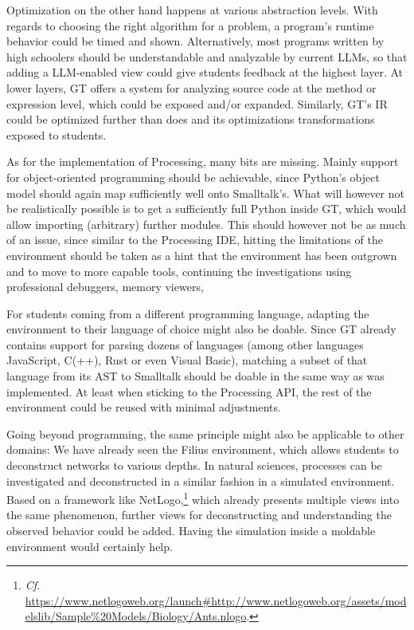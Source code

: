 Optimization on the other hand happens at various abstraction levels. With regards to choosing the right algorithm for a problem, a program's runtime behavior could be timed and shown. Alternatively, most programs written by high schoolers should be understandable and analyzable by current \acp{LLM}, so that adding a \ac{LLM}-enabled view could give students feedback at the highest layer. At lower layers, \ac{GT} offers a  system for analyzing source code at the method or expression level, which could be exposed and/or expanded. Similarly, \ac{GT}'s \ac{IR} could be optimized further than  does and its optimizations transformations exposed to students.

As for the implementation of Processing, many bits are missing. Mainly support for object-oriented programming should be achievable, since Python's object model should again map sufficiently well onto Smalltalk's. What will however not be realistically possible is to get a sufficiently full Python inside \ac{GT}, which would allow importing (arbitrary) further modules. This should however not be as much of an issue, since similar to the Processing \ac{IDE}, hitting the limitations of the environment should be taken as a hint that the environment has been outgrown and to move to more capable tools, continuing the investigations using professional debuggers, memory viewers, \etc

For students coming from a different programming language, adapting the environment to their language of choice might also be doable. Since \ac{GT} already contains support for parsing dozens of languages (among other languages JavaScript, C(++), Rust or even Visual Basic), matching a subset of that language from its \ac{AST} to Smalltalk should be doable in the same way as  was implemented. At least when sticking to the Processing \ac{API}, the rest of the environment could be reused with minimal adjustments.

Going beyond programming, the same principle might also be applicable to other domains: We have already seen the Filius environment, which allows students to deconstruct networks to various depths. In natural sciences, processes can be investigated and deconstructed in a similar fashion in a simulated environment. Based on a framework like NetLogo,\footnote{\emph{Cf.} \eg \url{https://www.netlogoweb.org/launch\#http://www.netlogoweb.org/assets/modelslib/Sample\%20Models/Biology/Ants.nlogo}.} which already presents multiple views into the same phenomenon, further views for deconstructing and understanding the observed behavior could be added. Having the simulation inside a moldable environment would certainly help.

